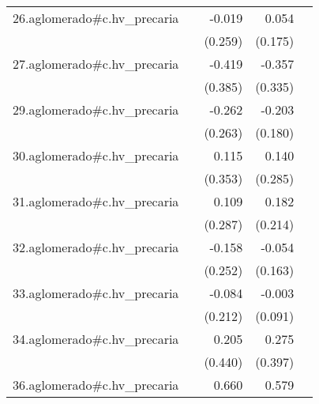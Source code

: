 {\begin{longtable}{l*{4}{D{.}{.}{-1}}}
\addlinespace
26.aglomerado#c.hv\_precaria&                     &      -0.019         &       0.054         &                     \\
            &                     &     (0.259)         &     (0.175)         &                     \\
\addlinespace
27.aglomerado#c.hv\_precaria&                     &      -0.419         &      -0.357         &                     \\
            &                     &     (0.385)         &     (0.335)         &                     \\
\addlinespace
29.aglomerado#c.hv\_precaria&                     &      -0.262         &      -0.203         &                     \\
            &                     &     (0.263)         &     (0.180)         &                     \\
\addlinespace
30.aglomerado#c.hv\_precaria&                     &       0.115         &       0.140         &                     \\
            &                     &     (0.353)         &     (0.285)         &                     \\
\addlinespace
31.aglomerado#c.hv\_precaria&                     &       0.109         &       0.182         &                     \\
            &                     &     (0.287)         &     (0.214)         &                     \\
\addlinespace
32.aglomerado#c.hv\_precaria&                     &      -0.158         &      -0.054         &                     \\
            &                     &     (0.252)         &     (0.163)         &                     \\
\addlinespace
33.aglomerado#c.hv\_precaria&                     &      -0.084         &      -0.003         &                     \\
            &                     &     (0.212)         &     (0.091)         &                     \\
\addlinespace
34.aglomerado#c.hv\_precaria&                     &       0.205         &       0.275         &                     \\
            &                     &     (0.440)         &     (0.397)         &                     \\
\addlinespace
36.aglomerado#c.hv\_precaria&                     &       0.660         &       0.579         &                     \\

\end{longtable}}
